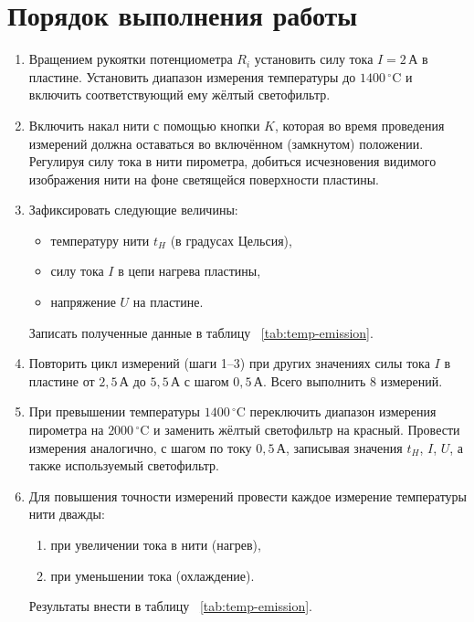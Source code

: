 \section*{Порядок выполнения работы}

\begin{enumerate}
    \item Вращением рукоятки потенциометра \( R_i \) установить силу тока \( I = 2\,\text{А} \) в пластине. Установить диапазон измерения температуры до \( 1400\,^\circ\text{C} \) и включить соответствующий ему жёлтый светофильтр.
    
    \item Включить накал нити с помощью кнопки \( K \), которая во время проведения измерений должна оставаться во включённом (замкнутом) положении. Регулируя силу тока в нити пирометра, добиться исчезновения видимого изображения нити на фоне светящейся поверхности пластины.
    
    \item Зафиксировать следующие величины:
    \begin{itemize}
        \item температуру нити \( t_H \) (в градусах Цельсия), 
        \item силу тока \( I \) в цепи нагрева пластины,
        \item напряжение \( U \) на пластине.
    \end{itemize}
    Записать полученные данные в таблицу ~\ref{tab:temp-emission}.
    
    \item Повторить цикл измерений (шаги 1–3) при других значениях силы тока \( I \) в пластине от \( 2{,}5\,\text{А} \) до \( 5{,}5\,\text{А} \) с шагом \( 0{,}5\,\text{А} \). Всего выполнить 8 измерений. 
    
    \item При превышении температуры \( 1400\,^\circ\text{C} \) переключить диапазон измерения пирометра на \( 2000\,^\circ\text{C} \) и заменить жёлтый светофильтр на красный. Провести измерения аналогично, с шагом по току \( 0{,}5\,\text{А} \), записывая значения \( t_H \), \( I \), \( U \), а также используемый светофильтр.
    
    \item Для повышения точности измерений провести каждое измерение температуры нити дважды:
    \begin{enumerate}
        \item при увеличении тока в нити (нагрев),
        \item при уменьшении тока (охлаждение).
    \end{enumerate}
    Результаты внести в таблицу ~\ref{tab:temp-emission}.
\end{enumerate}
